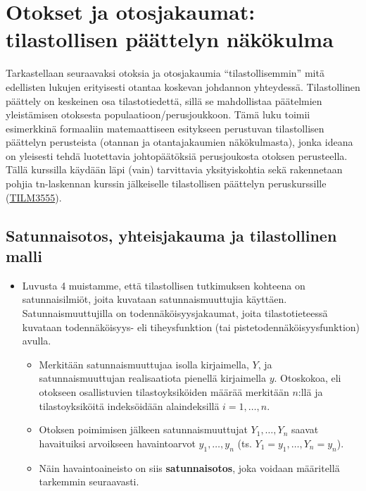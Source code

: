 \documentclass[
]{book}
\providecommand{\tightlist}{%
  \setlength{\itemsep}{0pt}\setlength{\parskip}{0pt}}
\begin{document}
\hypertarget{luku9}{%
\chapter{Otokset ja otosjakaumat: tilastollisen päättelyn näkökulma}\label{luku9}}

Tarkastellaan seuraavaksi otoksia ja otosjakaumia ``tilastollisemmin'' mitä edellisten lukujen erityisesti otantaa koskevan johdannon yhteydessä. Tilastollinen päättely on keskeinen osa tilastotiedettä, sillä se mahdollistaa päätelmien yleistämisen otoksesta populaatioon/perusjoukkoon. Tämä luku toimii esimerkkinä formaaliin matemaattiseen esitykseen perustuvan tilastollisen päättelyn perusteista (otannan ja otantajakaumien näkökulmasta), jonka ideana on yleisesti tehdä luotettavia johtopäätöksiä perusjoukosta otoksen perusteella. Tällä kurssilla käydään läpi (vain) tarvittavia yksityiskohtia sekä rakennetaan pohjia tn-laskennan kurssin jälkeiselle tilastollisen päättelyn peruskurssille (\href{https://opas.peppi.utu.fi/fi/opintojakso/TILM3555/1731}{TILM3555}).

\hypertarget{alaluku91}{%
\section{Satunnaisotos, yhteisjakauma ja tilastollinen malli}\label{alaluku91}}

\begin{itemize}
\tightlist
\item
  Luvusta 4 muistamme, että tilastollisen tutkimuksen kohteena on satunnaisilmiöt, joita kuvataan satunnaismuuttujia käyttäen. Satunnaismuuttujilla on todennäköisyysjakaumat, joita tilastotieteessä kuvataan todennäköisyys- eli tiheysfunktion (tai pistetodennäköisyysfunktion) avulla.

  \begin{itemize}
  \tightlist
  \item
    Merkitään satunnaismuuttujaa isolla kirjaimella, \(Y\), ja satunnaismuuttujan realisaatiota pienellä kirjaimella \(y\). Otoskokoa, eli otokseen osallistuvien tilastoyksiköiden määrää merkitään \(n\):llä ja tilastoyksiköitä indeksöidään alaindeksillä \(i=1,\ldots,n\).
  \item
    Otoksen poimimisen jälkeen satunnaismuuttujat \(Y_1, \ldots, Y_n\) saavat havaituiksi arvoikseen havaintoarvot \(y_1, \ldots, y_n\) (ts. \(Y_1=y_1, \ldots, Y_n = y_n\)).
  \item
    Näin havaintoaineisto on siis \textbf{satunnaisotos}, joka voidaan määritellä tarkemmin seuraavasti.
  \end{itemize}
\end{itemize}
\end{document}
